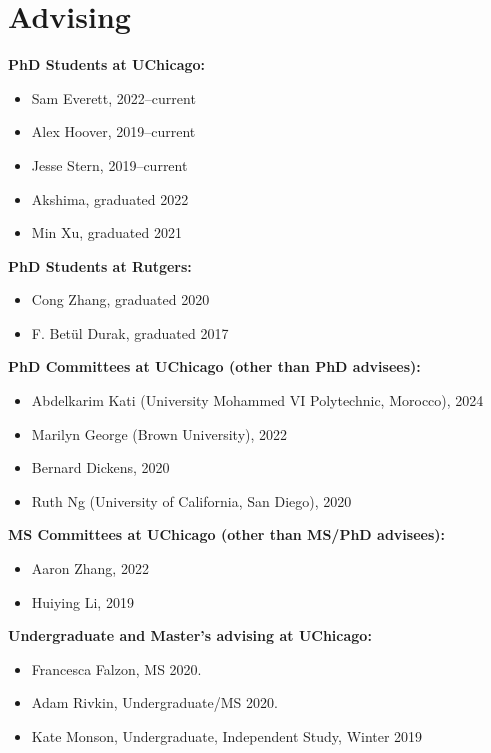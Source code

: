 
\section*{Advising}

\noindent\textbf{PhD Students at UChicago:} 
\begin{itemize}
    \item Sam Everett, 2022--current
    \item Alex Hoover, 2019--current
    \item Jesse Stern, 2019--current
    \item Akshima, graduated 2022
    \item Min Xu, graduated 2021
\end{itemize}


\smallskip

\noindent\textbf{PhD Students at Rutgers:} 
\begin{itemize}
    \item Cong Zhang, graduated 2020 
    \item F. Bet\"ul Durak, graduated 2017
\end{itemize}

\smallskip

\noindent\textbf{PhD Committees at UChicago (other than PhD advisees):} 
\begin{itemize}
    \item Abdelkarim Kati (University Mohammed VI Polytechnic, Morocco), 2024
    \item Marilyn George (Brown University), 2022
    \item Bernard Dickens, 2020
    \item Ruth Ng (University of California, San Diego), 2020
\end{itemize}

\smallskip

\noindent\textbf{MS Committees at UChicago (other than MS/PhD advisees):} 
\begin{itemize}
    \item Aaron Zhang, 2022
    \item Huiying Li, 2019
\end{itemize}

\smallskip

\noindent\textbf{Undergraduate and Master's advising at UChicago:}
\begin{itemize}
    \item Francesca Falzon, MS 2020.
    \item Adam Rivkin, Undergraduate/MS 2020.
    \item Kate Monson, Undergraduate, Independent Study, Winter 2019
\end{itemize}

